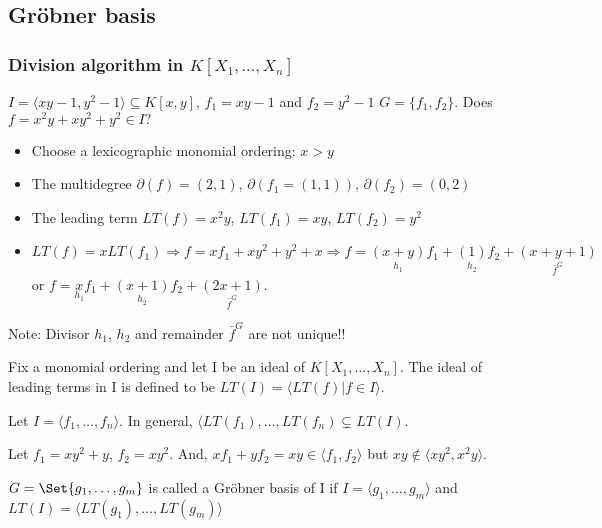 \subsection{Gr\"{o}bner basis}

\subsubsection{Division algorithm in $K[X_1,\dots,X_n]$}

\begin{example}
  $I = \langle xy-1,y^2-1\rangle \subseteq K[x,y]$, $f_1 = xy-1$ and $f_2 = y^2-1$ $G=\{f_1,f_2\}$. Does $f = x^2y+xy^2+y^2 \in I?$
  \begin{itemize}
      \item Choose a lexicographic monomial ordering: $x > y$
      \item The multidegree $\partial(f) = (2,1)$, $\partial(f_1 = (1,1))$, $\partial(f_2) = (0,2)$
      \item The leading term $LT(f) = x^2y$, $LT(f_1) = xy$, $LT(f_2) = y^2$
      \item $LT(f) = xLT(f_1) \Rightarrow f = xf_1+xy^2+y^2+x \Rightarrow f = \underset{h_1}{(x+y)}f_1+\underset{h_2}{(1)}f_2+\underset{\bar{f}^G}{(x+y+1)}$ or $f = \underset{h_1}{x}f_1+\underset{h_2}{(x+1)}f_2+\underset{\bar{f}^G}{(2x+1)}$.
  \end{itemize}
  Note:  Divisor $h_1$, $h_2$ and remainder $\bar{f}^G$ are not unique!! 
\end{example}

\begin{definition}
  Fix a monomial ordering and let I be an ideal of $K[X_1,\dots,X_n]$. The ideal of leading terms in I is defined to be $LT(I) = \langle LT(f)|f\in I \rangle$.
\end{definition}

\begin{remark}
  Let $I = \langle f_1,\dots,f_n \rangle$. In general, $\langle LT(f_1),\dots,LT(f_n) \subsetneq LT(I)$.
\end{remark}

\begin{example}
  Let $f_1=xy^2+y$, $f_2=xy^2$. And, $xf_1+yf_2=xy \in \langle f_1,f_2 \rangle$ but $xy \notin \langle xy^2, x^2y \rangle$.
\end{example}

\begin{definition}
  $G = \Set{g_1,\dots,g_m}$ is called a Gr\"{o}bner basis of I if $I = \langle g_1,\dots,g_m \rangle$ and $LT(I) = \langle LT(g_1),\dots,LT(g_m) \rangle$
\end{definition}

